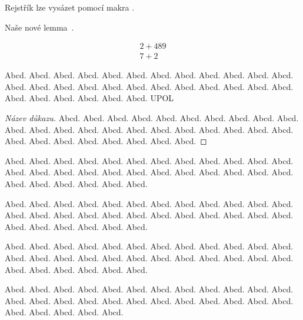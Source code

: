 \documentclass[
  master=false,               %
  font=sans,                  %
  printversion=false,         %
  joinlists=true,             %
  glossaries=true,            %
  figures=true,               %
  tables=true,                %
  sourcecodes=true,					  %
  theorems=true,						  %
  bibencoding=utf8,           %
  language=czech,             %
  encoding=utf8,              %
  field=inf,                  %
  index=true,                 %
]{updiplom}
\begin{document}
Rejstřík lze vysázet pomocí makra .

\begin{lemma}
Naše nové lemma~\cite{kniha2}.
\end{lemma}

\begin{align}
2+489 \\
7+2
\end{align}


\begin{definition}
Abcd. Abcd. Abcd. Abcd. Abcd. Abcd. Abcd. Abcd. Abcd. Abcd. Abcd. Abcd. Abcd. Abcd. Abcd. Abcd. Abcd. Abcd. Abcd. Abcd. Abcd. Abcd. Abcd. Abcd. Abcd. Abcd. Abcd. Abcd. Abcd. Abcd. \gls{UPOL}
\end{definition}

\begin{proof}[Název důkazu]
Abcd. Abcd. Abcd. Abcd. Abcd. Abcd. Abcd. Abcd. Abcd. Abcd. Abcd. Abcd. Abcd. Abcd. Abcd. Abcd. Abcd. Abcd. Abcd. Abcd. Abcd. Abcd. Abcd. Abcd. Abcd. Abcd. Abcd. Abcd. Abcd. Abcd. 
\end{proof}

\begin{remark}
Abcd. Abcd. Abcd. Abcd. Abcd. Abcd. Abcd. Abcd. Abcd. Abcd. Abcd. Abcd. Abcd. Abcd. Abcd. Abcd. Abcd. Abcd. Abcd. Abcd. Abcd. Abcd. Abcd. Abcd. Abcd. Abcd. Abcd. Abcd. Abcd. Abcd. 
\end{remark}

\begin{example}
Abcd. Abcd. Abcd. Abcd. Abcd. Abcd. Abcd. Abcd. Abcd. Abcd. Abcd. Abcd. Abcd. Abcd. Abcd. Abcd. Abcd. Abcd. Abcd. Abcd. Abcd. Abcd. Abcd. Abcd. Abcd. Abcd. Abcd. Abcd. Abcd. Abcd. 
\end{example}

\begin{lemma}
Abcd. Abcd. Abcd. Abcd. Abcd. Abcd. Abcd. Abcd. Abcd. Abcd. Abcd. Abcd. Abcd. Abcd. Abcd. Abcd. Abcd. Abcd. Abcd. Abcd. Abcd. Abcd. Abcd. Abcd. Abcd. Abcd. Abcd. Abcd. Abcd. Abcd. 
\end{lemma}

\begin{consequence}
Abcd. Abcd. Abcd. Abcd. Abcd. Abcd. Abcd. Abcd. Abcd. Abcd. Abcd. Abcd. Abcd. Abcd. Abcd. Abcd. Abcd. Abcd. Abcd. Abcd. Abcd. Abcd. Abcd. Abcd. Abcd. Abcd. Abcd. Abcd. Abcd. 
\end{consequence}
\end{document}
